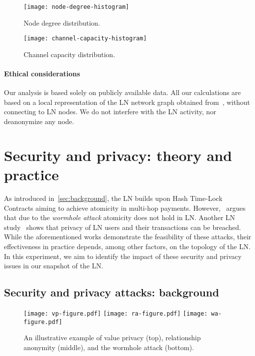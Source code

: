 \begin{figure}[tb]
	\centering
	\texttt{[image: node-degree-histogram]}
	\caption{Node degree distribution.\label{fig:node-degree-histogram}}
\end{figure}

\begin{figure}[tb]
	\centering
	\texttt{[image: channel-capacity-histogram]}
	\caption{Channel capacity distribution.\label{fig:channel-capacity-histogram}}
\end{figure}

\paragraph{Ethical considerations} 
Our analysis is based solely on publicly available data.
All our calculations are based on a local representation of the LN network graph obtained from~\cite{fiatjaf2020}, without connecting to LN nodes.
We do not interfere with the LN activity, nor deanonymize any node.



\section{Security and privacy: theory and practice}
\label{sec:sec-priv-attacks}

As introduced in~\cref{sec:background}, the LN builds upon Hash Time-Lock Contracts aiming to achieve atomicity in multi-hop payments.
However,~\cite{Malavolta2019} argues that due to the \emph{wormhole attack} atomicity does not hold in LN.
Another LN study~\cite{Malavolta2017} shows that privacy of LN users and their transactions can be breached.
While the aforementioned works demonstrate the feasibility of these attacks, their effectiveness in practice depends, among other factors, on the topology of the LN.
In this experiment, we aim to identify the impact of these security and privacy issues in our snapshot of the LN.

\subsection{Security and privacy attacks: background}

\begin{figure*}[tb]
	\texttt{[image: vp-figure.pdf]}
	\vspace{0.3cm}
	\texttt{[image: ra-figure.pdf]}
	\vspace{0.3cm}
	\texttt{[image: wa-figure.pdf]}
	\caption{An illustrative example of value privacy (top), relationship anonymity (middle), and the wormhole attack (bottom).}
	\label{fig:wormhole-attack}
\end{figure*}

